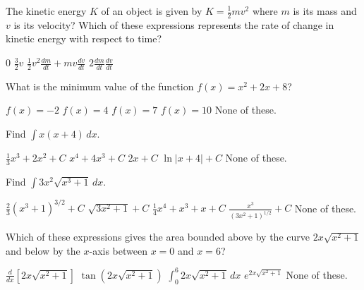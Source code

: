 \documentclass[12pt]{exam}
\newcommand{\<}{\langle}
\renewcommand{\>}{\rangle}
\begin{document}
\begin{questions}

\setcounter{question}{0}

\question[20]
The kinetic energy \(K\) of an object is given by \(K=\frac{1}{2}mv^2\)
where \(m\) is its mass and \(v\) is its velocity?
Which of these expressions represents the rate of change in kinetic energy
with respect to time?

\begin{checkboxes}
  \choice \(0\)
  \choice \(\frac{3}{2}v\)
  \choice \(\frac{1}{2}v^2\frac{dm}{dt}+mv\frac{dv}{dt}\)
  \choice \(2\frac{dm}{dt}\frac{dv}{dt}\)
\end{checkboxes}

\vfill

\question[20]
What is the minimum value of the function \(f(x)=x^2+2x+8\)?

\begin{checkboxes}
  \choice \(f(x)=-2\)
  \choice \(f(x)=4\)
  \choice \(f(x)=7\)
  \choice \(f(x)=10\)
  \choice None of these.
\end{checkboxes}

\vfill

\question[20]
Find \(\int x(x+4)\,dx\).

\begin{checkboxes}
  \choice \(\frac{1}{3}x^3+2x^2+C\)
  \choice \(x^4+4x^3+C\)
  \choice \(2x+C\)
  \choice \(\ln|x+4|+C\)
  \choice None of these.
\end{checkboxes}

\vfill
\newpage

\question[20]
Find \(\int 3x^2\sqrt{x^3+1}\,dx\).

\begin{checkboxes}
  \choice \(\frac{2}{3}(x^3+1)^{3/2}+C\)
  \choice \(\sqrt{3x^2+1}+C\)
  \choice \(\frac{1}{4}x^4+x^3+x+C\)
  \choice \(\frac{x^3}{(3x^2+1)^{1/2}}+C\)
  \choice None of these.
\end{checkboxes}

\vfill

\question[20]
Which of these expressions gives the area bounded above by
the curve \(2x\sqrt{x^2+1}\) and below by the \(x\)-axis between
\(x=0\) and \(x=6\)?


\begin{checkboxes}
  \choice \(\frac{d}{dx}[2x\sqrt{x^2+1}]\)
  \choice \(\tan(2x\sqrt{x^2+1})\)
  \choice \(\int_0^6 2x\sqrt{x^2+1}\,dx\)
  \choice \(e^{2x\sqrt{x^2+1}}\)
  \choice None of these.
\end{checkboxes}


\end{questions}
\end{document}
